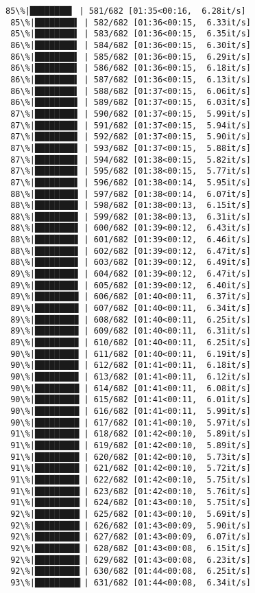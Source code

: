 \documentclass[11pt]{article}
\begin{document}
\begin{Verbatim}[commandchars=\\\{\}]
 85\%|████████▌ | 581/682 [01:35<00:16,  6.28it/s]
 85\%|████████▌ | 582/682 [01:36<00:15,  6.33it/s]
 85\%|████████▌ | 583/682 [01:36<00:15,  6.35it/s]
 86\%|████████▌ | 584/682 [01:36<00:15,  6.30it/s]
 86\%|████████▌ | 585/682 [01:36<00:15,  6.29it/s]
 86\%|████████▌ | 586/682 [01:36<00:15,  6.18it/s]
 86\%|████████▌ | 587/682 [01:36<00:15,  6.13it/s]
 86\%|████████▌ | 588/682 [01:37<00:15,  6.06it/s]
 86\%|████████▋ | 589/682 [01:37<00:15,  6.03it/s]
 87\%|████████▋ | 590/682 [01:37<00:15,  5.99it/s]
 87\%|████████▋ | 591/682 [01:37<00:15,  5.94it/s]
 87\%|████████▋ | 592/682 [01:37<00:15,  5.90it/s]
 87\%|████████▋ | 593/682 [01:37<00:15,  5.88it/s]
 87\%|████████▋ | 594/682 [01:38<00:15,  5.82it/s]
 87\%|████████▋ | 595/682 [01:38<00:15,  5.77it/s]
 87\%|████████▋ | 596/682 [01:38<00:14,  5.95it/s]
 88\%|████████▊ | 597/682 [01:38<00:14,  6.07it/s]
 88\%|████████▊ | 598/682 [01:38<00:13,  6.15it/s]
 88\%|████████▊ | 599/682 [01:38<00:13,  6.31it/s]
 88\%|████████▊ | 600/682 [01:39<00:12,  6.43it/s]
 88\%|████████▊ | 601/682 [01:39<00:12,  6.46it/s]
 88\%|████████▊ | 602/682 [01:39<00:12,  6.47it/s]
 88\%|████████▊ | 603/682 [01:39<00:12,  6.49it/s]
 89\%|████████▊ | 604/682 [01:39<00:12,  6.47it/s]
 89\%|████████▊ | 605/682 [01:39<00:12,  6.40it/s]
 89\%|████████▉ | 606/682 [01:40<00:11,  6.37it/s]
 89\%|████████▉ | 607/682 [01:40<00:11,  6.34it/s]
 89\%|████████▉ | 608/682 [01:40<00:11,  6.25it/s]
 89\%|████████▉ | 609/682 [01:40<00:11,  6.31it/s]
 89\%|████████▉ | 610/682 [01:40<00:11,  6.25it/s]
 90\%|████████▉ | 611/682 [01:40<00:11,  6.19it/s]
 90\%|████████▉ | 612/682 [01:41<00:11,  6.18it/s]
 90\%|████████▉ | 613/682 [01:41<00:11,  6.12it/s]
 90\%|█████████ | 614/682 [01:41<00:11,  6.08it/s]
 90\%|█████████ | 615/682 [01:41<00:11,  6.01it/s]
 90\%|█████████ | 616/682 [01:41<00:11,  5.99it/s]
 90\%|█████████ | 617/682 [01:41<00:10,  5.97it/s]
 91\%|█████████ | 618/682 [01:42<00:10,  5.89it/s]
 91\%|█████████ | 619/682 [01:42<00:10,  5.89it/s]
 91\%|█████████ | 620/682 [01:42<00:10,  5.73it/s]
 91\%|█████████ | 621/682 [01:42<00:10,  5.72it/s]
 91\%|█████████ | 622/682 [01:42<00:10,  5.75it/s]
 91\%|█████████▏| 623/682 [01:42<00:10,  5.76it/s]
 91\%|█████████▏| 624/682 [01:43<00:10,  5.75it/s]
 92\%|█████████▏| 625/682 [01:43<00:10,  5.69it/s]
 92\%|█████████▏| 626/682 [01:43<00:09,  5.90it/s]
 92\%|█████████▏| 627/682 [01:43<00:09,  6.07it/s]
 92\%|█████████▏| 628/682 [01:43<00:08,  6.15it/s]
 92\%|█████████▏| 629/682 [01:43<00:08,  6.23it/s]
 92\%|█████████▏| 630/682 [01:44<00:08,  6.25it/s]
 93\%|█████████▎| 631/682 [01:44<00:08,  6.34it/s]

\end{Verbatim}
\end{document}
